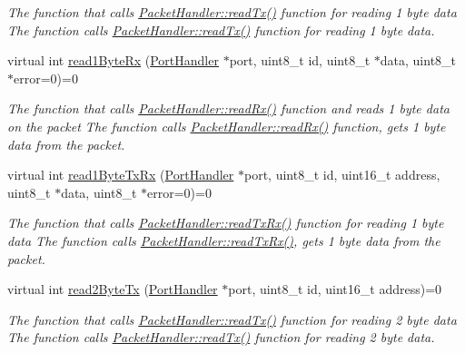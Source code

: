 \begin{DoxyCompactItemize}
\begin{DoxyCompactList}\small\item\em The function that calls \hyperlink{classmercury_1_1_packet_handler_a58220a79dcdff959241bd5688e6dbb1a}{Packet\+Handler\+::read\+Tx()} function for reading 1 byte data  The function calls \hyperlink{classmercury_1_1_packet_handler_a58220a79dcdff959241bd5688e6dbb1a}{Packet\+Handler\+::read\+Tx()} function for reading 1 byte data. \end{DoxyCompactList}\item 
virtual int \hyperlink{classmercury_1_1_packet_handler_a0162ef35e4e4e3faa1f2130728e7cee3}{read1\+Byte\+Rx} (\hyperlink{classmercury_1_1_port_handler}{Port\+Handler} $\ast$port, uint8\+\_\+t id, uint8\+\_\+t $\ast$data, uint8\+\_\+t $\ast$error=0)=0
\begin{DoxyCompactList}\small\item\em The function that calls \hyperlink{classmercury_1_1_packet_handler_a0857bd487c48ea83fc2b93e1e3e80200}{Packet\+Handler\+::read\+Rx()} function and reads 1 byte data on the packet  The function calls \hyperlink{classmercury_1_1_packet_handler_a0857bd487c48ea83fc2b93e1e3e80200}{Packet\+Handler\+::read\+Rx()} function,  gets 1 byte data from the packet. \end{DoxyCompactList}\item 
virtual int \hyperlink{classmercury_1_1_packet_handler_a69f3253e59e7b285747db9dcd4c02723}{read1\+Byte\+Tx\+Rx} (\hyperlink{classmercury_1_1_port_handler}{Port\+Handler} $\ast$port, uint8\+\_\+t id, uint16\+\_\+t address, uint8\+\_\+t $\ast$data, uint8\+\_\+t $\ast$error=0)=0
\begin{DoxyCompactList}\small\item\em The function that calls \hyperlink{classmercury_1_1_packet_handler_ac743a57bba9e71aadb1578f0e704f166}{Packet\+Handler\+::read\+Tx\+Rx()} function for reading 1 byte data  The function calls \hyperlink{classmercury_1_1_packet_handler_ac743a57bba9e71aadb1578f0e704f166}{Packet\+Handler\+::read\+Tx\+Rx()},  gets 1 byte data from the packet. \end{DoxyCompactList}\item 
virtual int \hyperlink{classmercury_1_1_packet_handler_aecb0bdf7b52d85e417b2bd2d5c539266}{read2\+Byte\+Tx} (\hyperlink{classmercury_1_1_port_handler}{Port\+Handler} $\ast$port, uint8\+\_\+t id, uint16\+\_\+t address)=0
\begin{DoxyCompactList}\small\item\em The function that calls \hyperlink{classmercury_1_1_packet_handler_a58220a79dcdff959241bd5688e6dbb1a}{Packet\+Handler\+::read\+Tx()} function for reading 2 byte data  The function calls \hyperlink{classmercury_1_1_packet_handler_a58220a79dcdff959241bd5688e6dbb1a}{Packet\+Handler\+::read\+Tx()} function for reading 2 byte data. \end{DoxyCompactList}\item 

\end{DoxyCompactItemize}
